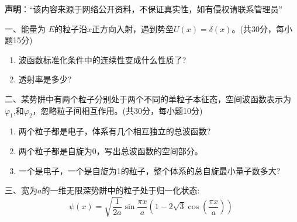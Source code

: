 
\textbf{声明}：“该内容来源于网络公开资料，不保证真实性，如有侵权请联系管理员”

一、能量为 $E$的粒子沿$x$正方向入射，遇到势垒$U(x)=\delta(x)$。(共30分，每小题15分)
\begin{enumerate}
\item 波函数标准化条件中的连续性变成什么性质了?
\item 透射率是多少?
\end{enumerate}

二、某势阱中有两个粒子分别处于两个不同的单粒子本征态，空间波函数表示为$\varphi_1$,和$\varphi_2$，忽略粒子间相互作用。(共30分，每小题10分)
\begin{enumerate}
\item 两个粒子都是电子，体系有几个相互独立的总波函数?
\item 两个粒子都是自旋为0，写出总波函数的空间部分。
\item 一个是电子，一个是自旋为1的粒子，整个体系的总自旋最小量子数多大?
\end{enumerate}

三、宽为$a$的一维无限深势阱中的粒子处于归一化状态:
$$\psi(x) = \sqrt{\frac{1}{2a}} \sin  \frac{\pi x}{a} \left(1 - 2 \sqrt{3} \cos \left( \frac{\pi x}{a} \right) \right)~$$